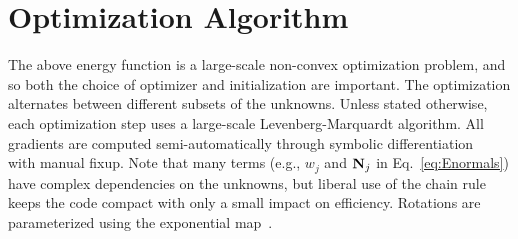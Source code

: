 \documentclass[preprint]{acmsiggraph}
\begin{document}






\section{Optimization Algorithm}
\label{sec:optimization}

The above energy function is a large-scale non-convex optimization
problem, and so both the choice of optimizer and initialization are
important.  The optimization alternates between different subsets of the unknowns.  Unless stated otherwise, each optimization step uses a large-scale Levenberg-Marquardt algorithm.  All gradients are computed semi-automatically through symbolic differentiation~\cite{Paprocki11} with manual fixup. Note that many terms (e.g., $w_j$ and $\mathbf{N}_j$ in Eq.~\ref{eq:Enormals}) have complex dependencies on the unknowns, but liberal use of the chain rule keeps the code compact with only a small impact on efficiency.  Rotations are parameterized using the exponential map~\cite{Grassia00}.
\end{document}
